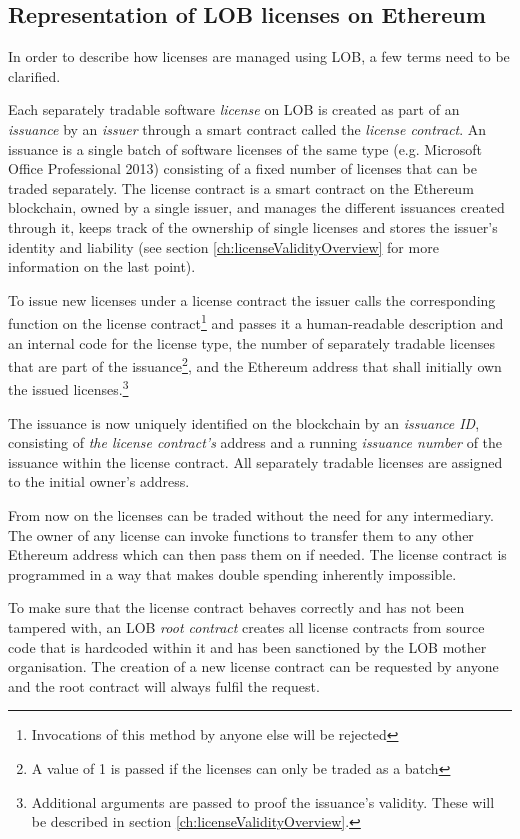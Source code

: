 \documentclass[a4paper]{article}
\begin{document}
\subsection{Representation of LOB licenses on Ethereum}
\label{ch:licenseRepresentationOverview}

In order to describe how licenses are managed using LOB, a few terms need to be clarified.

Each separately tradable software \emph{license} on LOB is created as part of an \emph{issuance} by an \emph{issuer} through a smart contract called the \emph{license contract}. An issuance is a single batch of software licenses of the same type (e.g. Microsoft Office Professional 2013) consisting of a fixed number of licenses that can be traded separately. The license contract is a smart contract on the Ethereum blockchain, owned by a single issuer, and manages the different issuances created through it, keeps track of the ownership of single licenses and stores the issuer's identity and liability (see section \ref{ch:licenseValidityOverview} for more information on the last point).

To issue new licenses under a license contract the issuer calls the corresponding function on the license contract\footnote{Invocations of this method by anyone else will be rejected} and passes it a human-readable description and an internal code for the license type, the number of separately tradable licenses that are part of the issuance\footnote{A value of 1 is passed if the licenses can only be traded as a batch}, and the Ethereum address that shall initially own the issued licenses.\footnote{Additional arguments are passed to proof the issuance's validity. These will be described in section \ref{ch:licenseValidityOverview}.}

The issuance is now uniquely identified on the blockchain by an \emph{issuance ID}, consisting of \emph{the license contract's} address and a running \emph{issuance number} of the issuance within the license contract. All separately tradable licenses are assigned to the initial owner's address.

From now on the licenses can be traded without the need for any intermediary. The owner of any license can invoke functions to transfer them to any other Ethereum address which can then pass them on if needed. The license contract is programmed in a way that makes double spending inherently impossible.

To make sure that the license contract behaves correctly and has not been tampered with, an LOB \emph{root contract} creates all license contracts from source code that is hardcoded within it and has been sanctioned by the LOB mother organisation. The creation of a new license contract can be requested by anyone and the root contract will always fulfil the request.
\end{document}
